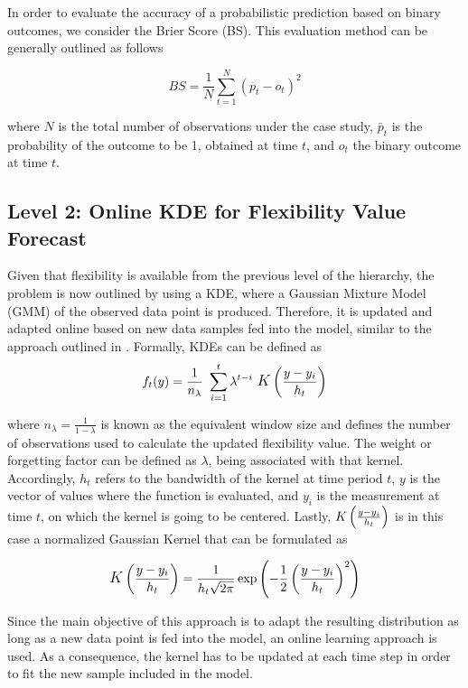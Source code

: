 In order to evaluate the accuracy of a probabilistic prediction based on binary outcomes, we consider the Brier Score (BS). This evaluation method can be generally outlined as follows

\begin{equation}
    BS = \frac{1}{N} \sum_{t=1}^{N} (\overline{p}_{t} - o_{t})^2
\end{equation}


where $N$ is the total number of observations under the case study, $\bar{p}_{t}$ is the probability of the outcome to be 1, obtained at time $t$, and $o_{t}$ the binary outcome at time $t$.
\subsection{Level 2: Online KDE for Flexibility Value Forecast}
Given that flexibility is available from the previous level of the hierarchy, the problem is now outlined by using a KDE, where a Gaussian Mixture Model (GMM) \cite{Silverman1986} of the observed data point is produced. Therefore, it is updated and adapted online based on new data samples fed into the model, similar to the approach outlined in \cite{Kristan2010,Pinson2012}. Formally, KDEs can be defined as
\begin{equation}
    f_{t}(y)= \frac{1}{n_{\lambda}} \ \sum_{i=1}^{t} \lambda^{t-i} \ \mathlarger{K}\left(\frac{y - y_{i}}{h_{t}}\right) 
\end{equation}

where $n_{\lambda} = \frac{1}{1-\lambda}$ is known as the equivalent window size and defines the number of observations used to calculate the updated flexibility value. The weight or forgetting factor can be defined as $\lambda$, being associated with that kernel. Accordingly, $h_{t}$ refers to the bandwidth of the kernel at time period $t$, $y$ is the vector of values where the function is evaluated, and $y_{i}$ is the measurement at time $t$, on which the kernel is going to be centered. Lastly, $\mathlarger{K}\left(\frac{y - y_{i}}{h_{t}}\right)$ is in this case a normalized Gaussian Kernel that can be formulated as

\begin{equation}
 \mathlarger{K}\left(\frac{y - y_{i}}{h_{t}}\right) = \frac{1}{h_{t} \sqrt{2 \pi}} \exp{\left(-\frac{1}{2}\left(\frac{y - y_{i}}{h_{t}}\right)^2\right) }
\end{equation}


Since the main objective of this approach is to adapt the resulting distribution as long as a new data point is fed into the model, an online learning approach is used. As a consequence, the kernel has to be updated at each time step in order to fit the new sample included in the model.

